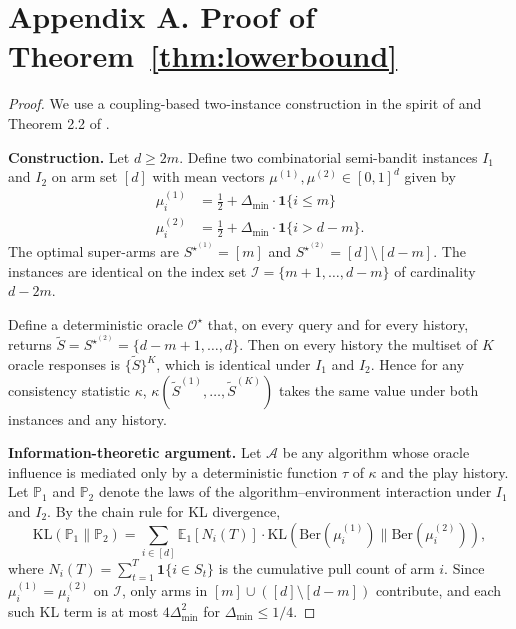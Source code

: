 \documentclass{article}
\theoremstyle{plain}
\theoremstyle{definition}
\theoremstyle{remark}
\newcommand{\E}{\mathbb{E}}
\newcommand{\Prob}{\mathbb{P}}
\newcommand{\opt}{S^{\star}}
\newcommand{\gap}{\Delta_{\min}}
\begin{document}



\appendix
\onecolumn

\section*{Appendix A. Proof of Theorem~\ref{thm:lowerbound}}
\label{app:lowerbound}

\begin{proof}
We use a coupling-based two-instance construction in the spirit of \citet{lykouris2018robust} and Theorem 2.2 of \citet{lattimore2020book}.

\textbf{Construction.} Let $d \geq 2m$. Define two combinatorial semi-bandit instances $I_1$ and $I_2$ on arm set $[d]$ with mean vectors $\mu^{(1)}, \mu^{(2)} \in [0,1]^d$ given by
\begin{align*}
\mu^{(1)}_i &= \tfrac{1}{2} + \gap \cdot \mathbf{1}\{i \leq m\} \\
\mu^{(2)}_i &= \tfrac{1}{2} + \gap \cdot \mathbf{1}\{i > d - m\}.
\end{align*}
The optimal super-arms are $\opt^{(1)} = [m]$ and $\opt^{(2)} = [d] \setminus [d-m]$. The instances are identical on the index set $\mathcal{I} = \{m+1, \dots, d-m\}$ of cardinality $d - 2m$.

Define a deterministic oracle $\mathcal{O}^{\star}$ that, on every query and for every history, returns $\tilde{S} = \opt^{(2)} = \{d-m+1, \dots, d\}$. Then on every history the multiset of $K$ oracle responses is $\{\tilde{S}\}^K$, which is identical under $I_1$ and $I_2$. Hence for any consistency statistic $\kappa$, $\kappa(\tilde{S}^{(1)}, \dots, \tilde{S}^{(K)})$ takes the same value under both instances and any history.

\textbf{Information-theoretic argument.} Let $\mathcal{A}$ be any algorithm whose oracle influence is mediated only by a deterministic function $\tau$ of $\kappa$ and the play history. Let $\Prob_1$ and $\Prob_2$ denote the laws of the algorithm--environment interaction under $I_1$ and $I_2$. By the chain rule for KL divergence,
\[
\mathrm{KL}(\Prob_1 \| \Prob_2) = \sum_{i \in [d]} \E_1[N_i(T)] \cdot \mathrm{KL}(\mathrm{Ber}(\mu^{(1)}_i) \| \mathrm{Ber}(\mu^{(2)}_i)),
\]
where $N_i(T) = \sum_{t=1}^T \mathbf{1}\{i \in S_t\}$ is the cumulative pull count of arm $i$. Since $\mu^{(1)}_i = \mu^{(2)}_i$ on $\mathcal{I}$, only arms in $[m] \cup ([d] \setminus [d-m])$ contribute, and each such KL term is at most $4\gap^2$ for $\gap \leq 1/4$.


\end{proof}
\end{document}
